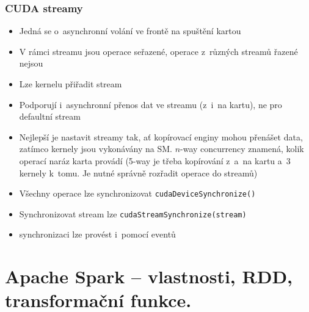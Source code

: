 \subsubsection{CUDA streamy}
\begin{itemize}
    \item Jedná se o~asynchronní volání ve frontě na spuštění kartou
    \item V rámci streamu jsou operace seřazené, operace z~různých streamů řazené nejsou
    \item Lze kernelu přiřadit stream
    \item Podporují i~asynchronní přenos dat ve streamu (z~i~na kartu), ne pro defaultní stream
    \item Nejlepší je nastavit streamy tak, ať kopírovací enginy mohou přenášet data, zatímco kernely jsou vykonávány na SM. \(n\)-way concurrency znamená, kolik operací naráz karta provádí (5-way je třeba kopírování z~a~na kartu a~3 kernely k~tomu. Je nutné správně rozřadit operace do streamů)
    \item Všechny operace lze synchronizovat \texttt{cudaDeviceSynchronize()}
    \item Synchronizovat stream lze \texttt{cudaStreamSynchronize(stream)}
    \item synchronizaci lze provést i~pomocí eventů
\end{itemize}



\section{Apache Spark – vlastnosti, RDD, transformační funkce.}
